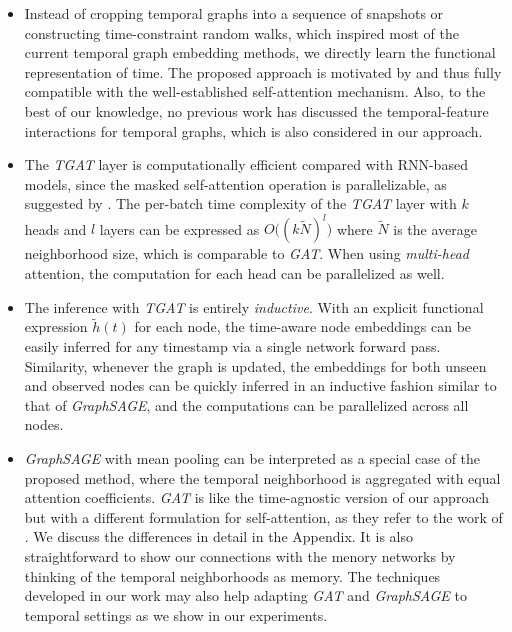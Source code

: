 \documentclass{article} %
\begin{document}
\begin{itemize}

\item Instead of cropping temporal graphs into a sequence of snapshots or constructing time-constraint random walks, which inspired most of the current temporal graph embedding methods, we directly learn the functional representation of time. The proposed approach is motivated by and thus fully compatible with the well-established self-attention mechanism. Also, to the best of our knowledge, no previous work has discussed the temporal-feature interactions for temporal graphs, which is also considered in our approach.
   
\item The \textsl{TGAT} layer is computationally efficient compared with RNN-based models, since the masked self-attention operation is parallelizable, as suggested by \cite{vaswani2017attention}. The per-batch time complexity of the \textsl{TGAT} layer with $k$ heads and $l$ layers can be expressed as $O\big( (k\tilde{N})^l  \big)$ where $\tilde{N}$ is the average neighborhood size, which is comparable to \textsl{GAT}. When using \textsl{multi-head} attention, the computation for each head can be parallelized as well.
    
\item The inference with \textsl{TGAT} is entirely \textsl{inductive}. With an explicit functional expression $\tilde{h}(t)$ for each node, the time-aware node embeddings can be easily inferred for any timestamp via a single network forward pass. Similarity, whenever the graph is updated, the embeddings for both unseen and observed nodes can be quickly inferred in an inductive fashion similar to that of \textsl{GraphSAGE}, and the computations can be parallelized across all nodes.
    
\item \textsl{GraphSAGE} with mean pooling \citep{hamilton2017inductive} can be interpreted as a special case of the proposed method, where the temporal neighborhood is aggregated with equal attention coefficients. \textsl{GAT} is like the time-agnostic version of our approach but with a different formulation for self-attention, as they refer to the work of \cite{bahdanau2014neural}. We discuss the differences in detail in the Appendix. It is also straightforward to show our connections with the menory networks \citep{sukhbaatar2015end} by thinking of the temporal neighborhoods as memory. The techniques developed in our work may also help adapting \textsl{GAT} and \textsl{GraphSAGE} to temporal settings as we show in our experiments.
\end{itemize}
\end{document}
